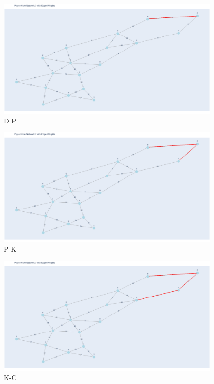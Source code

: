 \documentclass[11pt]{book}
\renewcommand{\=}[1]{\stackrel{#1}{=}} %
\theoremstyle{definition}
\theoremstyle{remark}
\begin{document}
\begin{figure}
    \centering
    \includegraphics[width=1\linewidth]{q5_plots/1.png}
    \caption{D-P}
    \label{fig:enter-label}
\end{figure}
\begin{figure}
    \centering
    \includegraphics[width=1\linewidth]{q5_plots/2.png}
    \caption{P-K}
    \label{fig:enter-label}
\end{figure}
\begin{figure}
    \centering
    \includegraphics[width=1\linewidth]{q5_plots/3.png}
    \caption{K-C}
    \label{fig:enter-label}
\end{figure}
\end{document}
